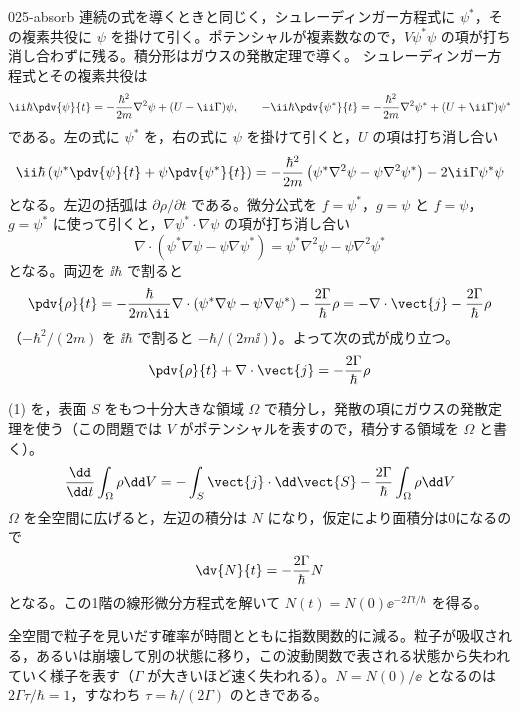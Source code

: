 \documentclass[uplatex,dvipdfmx,a4paper,11pt]{jsarticle}
\begin{document}
\kaitouhen
{}
\begin{kaisetsu}{025-absorb}
\houshin 連続の式を導くときと同じく，シュレーディンガー方程式に $\psi^{*}$，その複素共役に $\psi$ を掛けて引く。ポテンシャルが複素数なので，$V\psi^{*}\psi$ の項が打ち消し合わずに残る。積分形はガウスの発散定理で導く。
\keisan {} シュレーディンガー方程式とその複素共役は
\[
  \ii\hbar\pdv{\psi}{t}=-\frac{\hbar^{2}}{2m}\nabla^{2}\psi+(U-\ii\Gamma)\psi,\qquad
  -\ii\hbar\pdv{\psi^{*}}{t}=-\frac{\hbar^{2}}{2m}\nabla^{2}\psi^{*}+(U+\ii\Gamma)\psi^{*}
\]
である。左の式に $\psi^{*}$ を，右の式に $\psi$ を掛けて引くと，$U$ の項は打ち消し合い
\[
  \ii\hbar\left(\psi^{*}\pdv{\psi}{t}+\psi\pdv{\psi^{*}}{t}\right)=-\frac{\hbar^{2}}{2m}\left(\psi^{*}\nabla^{2}\psi-\psi\nabla^{2}\psi^{*}\right)-2\ii\Gamma\psi^{*}\psi
\]
となる。左辺の括弧は $\partial\rho/\partial t$ である。微分公式を $f=\psi^{*}$，$g=\psi$ と $f=\psi$，$g=\psi^{*}$ に使って引くと，$\nabla\psi^{*}\cdot\nabla\psi$ の項が打ち消し合い
\[
  \nabla\cdot\left(\psi^{*}\nabla\psi-\psi\nabla\psi^{*}\right)=\psi^{*}\nabla^{2}\psi-\psi\nabla^{2}\psi^{*}
\]
となる。両辺を $\ii\hbar$ で割ると
\[
  \pdv{\rho}{t}=-\frac{\hbar}{2m\ii}\nabla\cdot\left(\psi^{*}\nabla\psi-\psi\nabla\psi^{*}\right)-\frac{2\Gamma}{\hbar}\rho=-\nabla\cdot\vect{j}-\frac{2\Gamma}{\hbar}\rho
\]
（$-\hbar^{2}/(2m)$ を $\ii\hbar$ で割ると $-\hbar/(2m\ii)$）。よって次の式が成り立つ。
\[
  \pdv{\rho}{t}+\nabla\cdot\vect{j}=-\frac{2\Gamma}{\hbar}\rho
\]

 (1) を，表面 $S$ をもつ十分大きな領域 $\Omega$ で積分し，発散の項にガウスの発散定理を使う（この問題では $V$ がポテンシャルを表すので，積分する領域を $\Omega$ と書く）。
\[
  \frac{\dd}{\dd t}\int_{\Omega}\rho\dd V=-\int_{S}\vect{j}\cdot\dd\vect{S}-\frac{2\Gamma}{\hbar}\int_{\Omega}\rho\dd V
\]
$\Omega$ を全空間に広げると，左辺の積分は $N$ になり，仮定により面積分は0になるので
\[
  \dv{N}{t}=-\frac{2\Gamma}{\hbar}N
\]
となる。この1階の線形微分方程式を解いて $N(t)=N(0)\ee^{-2\Gamma t/\hbar}$ を得る。

 全空間で粒子を見いだす確率が時間とともに指数関数的に減る。粒子が吸収される，あるいは崩壊して別の状態に移り，この波動関数で表される状態から失われていく様子を表す（$\Gamma$ が大きいほど速く失われる）。$N=N(0)/\ee$ となるのは $2\Gamma\tau/\hbar=1$，すなわち $\tau=\hbar/(2\Gamma)$ のときである。


\end{kaisetsu}
\end{document}
